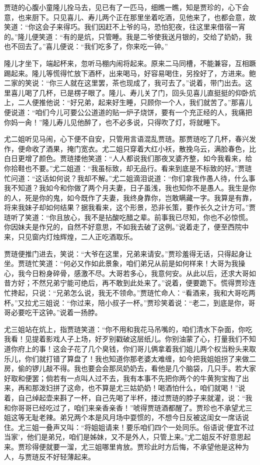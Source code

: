 \documentclass[12pt,oneside]{book}
\begin{document}
贾琏的心腹小童隆儿拴马去，见已有了一匹马，细瞧一瞧，知是贾珍的，心下会意，也来厨下。只见喜儿、寿儿两个正在那里坐着吃酒，见他来了，也都会意，故笑道：“你这会子来得巧。我们因赶不上爷的马，恐怕犯夜，往这里来借宿一宵的。”隆儿便笑道：“有的是炕，只管睡。我是二爷使我送月银的，交给了奶奶，我也不回去了。”喜儿便说：“我们吃多了，你来吃一钟。”

隆儿才坐下，端起杯来，忽听马棚内闹将起来。原来二马同槽，不能兼容，互相蹶踢起来。隆儿等慌得忙放下酒杯，出来喝马，好容易喝住，另拴好了，方进来。鲍二家的笑说：“你三人就在这里罢，茶也现成了，我可去了。”说着，带门出去。这里喜儿喝了几杯，已是楞子眼了。隆儿、寿儿关了门，回头见喜儿直挺挺的仰卧炕上，二人便推他说：“好兄弟，起来好生睡，只顾你一个人，我们就苦了。”那喜儿便说道：“咱们今儿可要公公道道的贴一炉子烧饼，要有一个充正经的人，我痛把你妈一肏！”隆儿寿儿见他醉了，也不必多说，只得吹了灯，将就睡下。

尤二姐听见马闹，心下便不自安，只管用言语混乱贾琏。那贾琏吃了几杯，春兴发作，便命收了酒果，掩门宽衣。尤二姐只穿着大红小袄，散挽乌云，满脸春色，比白日更增了颜色。贾琏搂他笑道：“人人都说我们那夜叉婆齐整，如今我看来，给你拾鞋也不要。”尤二姐道：“我虽标致，却无品行。看来到底是不标致的好。”贾琏忙问道：“这话如何说？我却不解。”尤二姐滴泪说道：“你们拿我作愚人待，什么事我不知道？我如今和你做了两个月夫妻，日子虽浅，我也知你不是愚人。我生是你的人，死是你的鬼，如今既作了夫妻，我终身靠你，岂敢瞒藏一字。我算是有靠，将来我妹子却如何结果？据我看来，这个形景，恐非长策，要作长久之计方可。”贾琏听了笑道：“你且放心，我不是拈酸吃醋之辈。前事我已尽知，你也不必惊慌。你因妹夫是作兄的，自然不好意思，不如我去破了这例。”说着走了，便至西院中来，只见窗内灯烛辉煌，二人正吃酒取乐。

贾琏便推门进去，笑说：“大爷在这里，兄弟来请安。”贾珍羞得无话，只得起身让坐。贾琏忙笑道：“何必又作如此景象，咱们弟兄从前是如何样来！大哥为我操心，我今日粉身碎骨，感激不尽。大哥若多心，我意何安。从此以后，还求大哥如昔方好；不然兄弟宁能可绝后，再不敢到此处来了。”说着，便要跪下。慌得贾珍连忙搀起，只说：“兄弟怎么说，我无不领命。”贾琏忙命人：“看酒来，我和大哥吃两杯。”又拉尤三姐说：“你过来，陪小叔子一杯。”贾珍笑着说：“老二，到底是你，哥哥必要吃干这钟。”说着一扬脖。

尤三姐站在炕上，指贾琏笑道：“你不用和我花马吊嘴的，咱们清水下杂面，你吃我看！见提着影戏人子上场，好歹别戳破这层纸儿。你别油蒙了心，打量我们不知道你府上的事！这会子花了几个臭钱，你们哥儿俩拿着我们姐儿两个权当粉头来取乐儿，你们就打错了算盘了！我也知道你那老婆太难缠，如今把我姐姐拐了来做二房，偷的锣儿敲不得。我也要会会那凤奶奶去，看他是几个脑袋，几只手。若大家好取和便罢；倘若有一点叫人过不去，我有本事不先把你两个的牛黄狗宝掏了出来，再和那泼妇拼了这命，也不算是尤三姑奶奶！喝酒怕什么，咱们就喝！”说着，自己绰起壶来斟了一杯，自己先喝了半杯，搂过贾琏的脖子来就灌，说：“我和你哥哥已经吃过了，咱们来亲香亲香！”唬得贾琏酒都醒了。贾珍也不承望尤三姐这等无耻老辣。弟兄两个本是风月场中耍惯的，不想今日反被这闺女一席话说住。尤三姐一叠声又叫：“将姐姐请来！要乐咱们四个一处同乐。俗语说‘便宜不过当家’，他们是弟兄，咱们是姊妹，又不是外人，只管上来。”尤二姐反不好意思起来。贾珍得便就要一溜，尤三姐哪里肯放。贾珍此时方后悔，不承望他是这种为人，与贾琏反不好轻薄起来。
\end{document}
